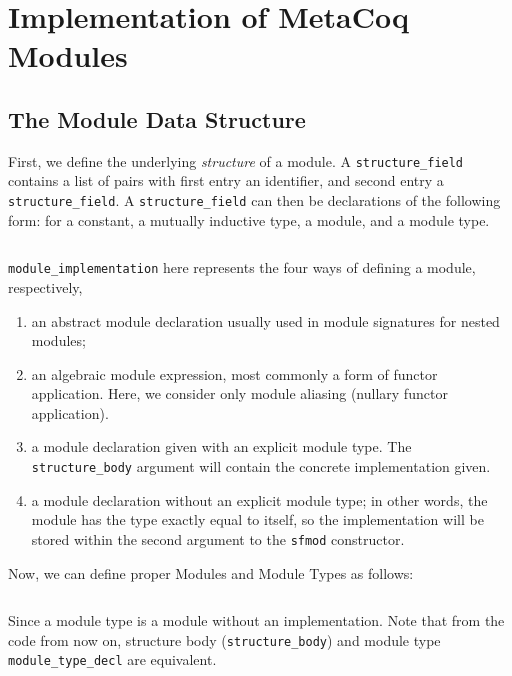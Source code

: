 \chapter{Implementation of MetaCoq Modules}
\newcommand{\tc}[3]{\inputminted[firstline={#1},lastline={#2},linenos]{Coq}{
  code/v1/template-coq/theories/#3}}
\newcommand{\pcuic}[3]{\inputminted[firstline={#1},lastline={#2},linenos]{Coq}{
  code/v1/pcuic/theories/#3}}

\section{The Module Data Structure}

First, we define the underlying \emph{structure} of a module. A
\verb|structure_field| contains a list of pairs with first entry an identifier,
and second entry a \verb|structure_field|. A \verb|structure_field| can then be
declarations of the following form: for a constant, a mutually inductive type, a
module, and a module type.

\tc{324}{336}{Environment.v}

\verb|module_implementation| here represents the four ways of defining a module,
respectively,
\begin{enumerate}
  \item an abstract module declaration usually used in module signatures for
  nested modules;
  \item an algebraic module expression, most commonly a form of functor
  application. Here, we consider only module aliasing (nullary functor
  application).
  \item a module declaration given with an explicit module type. The
  \verb|structure_body| argument will contain the concrete implementation given.
  \item a module declaration without an explicit module type; in other words,
  the module has the type exactly equal to itself, so the implementation will be
  stored within the second argument to the \verb|sfmod| constructor.
\end{enumerate}

Now, we can define proper Modules and Module Types as follows:
\tc{344}{345}{Environment.v}

Since a module type is a module without an implementation. Note that from the
code from now on, structure body (\verb|structure_body|) and module type
\verb|module_type_decl| are equivalent. 

